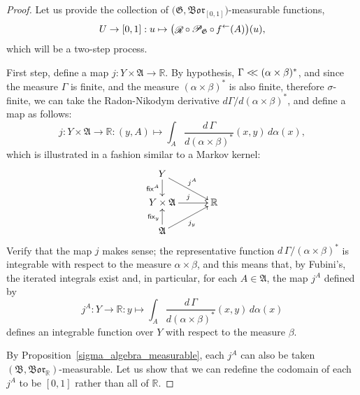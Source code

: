 \documentclass[
twoside=true,
paper=letter,
fontsize=9pt,
pagesize=auto,
leqno,
openany,
headsepline,
overfullrule,
]{scrbook}
\theoremstyle{plain}
\theoremstyle{plain}
\theoremstyle{definition}
\theoremstyle{bfnoteitalic}
\theoremstyle{bfnoteroman}
\newcommand{\sigalg}[1]{\mathfrak{#1}}
\newcommand{\cali}[1]{\mathscr{#1}}
\newcommand{\sfop}[1]{\mathsf{#1}}
\newcommand{\condprobop}[1]{\mathop{\cali{P}\hspace{-1pt}}\nolimits_{#1}}
\newcommand{\borel}{\mathfrak{Bor}}
\newcommand{\textsigma}{\hbox{\large{$\sigma$}}\kern-1pt}
\newcommand{\preimage}[1]{\mathop{#1^{\leftarrow}}}
\newcommand{\R}{\mathbb{R}}
\newcommand{\sigmaalgebra}{\sigalg{A}}
\newcommand{\sigmaalgebraii}{\sigalg{B}}
\newcommand{\funcj}{j}
\newcommand{\function}{f}
\newcommand{\measurespaceii}{Y}
\newcommand{\mspaceelt}{x}
\newcommand{\mspaceeltii}{y}
\newcommand{\abscont}{\mathrel{< \kern-3.5pt <}}
\newcommand{\seti}{A}
\newcommand{\regular}{\mathop{\cali{R}}}
\newcommand{\fixinthefirst}[1]{\sfop{fix}_{#1}}
\newcommand{\fixinthesecond}[1]{\sfop{fix}^{#1}}
\newcommand{\uspace}{U}%
\newcommand{\uspaceelt}{u}
\newcommand{\measonprod}{\Gamma}%
\newcommand{\marginalone}{\alpha}%
\newcommand{\marginaltwo}{\beta}%
\begin{document}
\begin{proof}
Let us provide the collection of
$\bigl(\sigalg{G}, \borel_{[0,1]}\bigr)$\hyp{}measurable functions,
\[
\uspace\to [0,1] : \uspaceelt\mapsto
\bigl( \regular\circ\condprobop{\sigalg{G}}\circ\preimage{\function}
(\seti)\bigr)(\uspaceelt),
\]
which will be a two-step process.

First step, define a map
$\funcj:\measurespaceii\times\sigmaalgebra\to \R$. By hypothesis,
$\measonprod \abscont (\marginalone\times\marginaltwo)^*$, and since the measure
$\measonprod$ is finite, and the measure $(\marginalone\times\marginaltwo)^*$ is also finite, therefore \textsigma\hyp{}finite, we can take the Radon-Nikodym derivative
$d\measonprod / d(\marginalone\times\marginaltwo)^*$, and define a map as follows:
\[
\funcj
:\measurespaceii\times\sigmaalgebra\to \R
:(\mspaceeltii,\seti)\mapsto
\int_\seti
\dfrac{d\,\measonprod}{d(\marginalone\times\marginaltwo)^*}
(\mspaceelt,\mspaceeltii)\, d\marginalone(\mspaceelt),
\]
which is illustrated in a fashion similar to a Markov kernel:
\[
\xymatrix@R=16pt@C=30pt{
\measurespaceii
\ar[d]_-{\fixinthesecond{\seti}}
\ar[dr]^{\funcj^\seti} &
\\
\measurespaceii\times\sigmaalgebra \ar[r]^{\funcj} & \R
\\
\sigmaalgebra
\ar[ur]_{\funcj_\mspaceeltii}
\ar[u]^{\fixinthefirst{\mspaceeltii}} &
\\
}
\]
Verify that the map $\funcj$ makes sense; the representative function
$d\,\measonprod/(\marginalone\times\marginaltwo)^*$
is integrable with respect to the measure
$\marginalone\times\marginaltwo$, and this means that, by Fubini's, the iterated integrals exist and, in particular, for each
$\seti\in\sigmaalgebra$,
the map $\funcj^\seti$ defined by
\[
\funcj^\seti:
\measurespaceii\to \R
:\mspaceeltii\mapsto
\int_\seti
\dfrac{d\,\measonprod}{d(\marginalone\times\marginaltwo)^*}
(\mspaceelt,\mspaceeltii)\, d\marginalone(\mspaceelt)
\]
defines an integrable function over
$\measurespaceii$ with respect to the measure $\marginaltwo$.

By Proposition~\ref{sigma_algebra_measurable}, each $\funcj^\seti$ can also be taken
$(\sigmaalgebraii,\borel_\R)$\hyp{}measurable.
Let us show that we can redefine the codomain of each
$\funcj^\seti$ to be $[0,1]$ rather than all of $\R$.


\end{proof}
\end{document}
